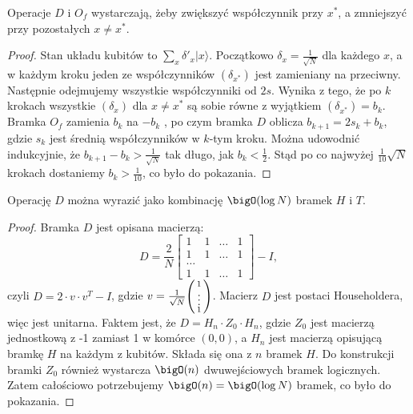 \begin{lemma}
    Operacje \( D \) i \( O_f \) wystarczają, żeby zwiększyć współczynnik przy \( x^{*} \), a zmniejszyć przy pozostałych \( x \neq x^{*} \).
\end{lemma}
\begin{proof}
    Stan układu kubitów to \( \sum_{x} \delta'_x |x\rangle \). Początkowo \( \delta_x = \frac{1}{\sqrt{N}} \) dla każdego \( x \),
    a w każdym kroku jeden ze współczynników \( (\delta_{x^{*}}) \) jest zamieniany na przeciwny. Następnie odejmujemy wszystkie współczynniki od \( 2s \).
    Wynika z tego, że po \( k \) krokach wszystkie \( (\delta_x) \) dla \( x \neq x^{*} \) są sobie równe z wyjątkiem \( (\delta_{x^{*}}) = b_k \).
    Bramka \( O_f \) zamienia \( b_k \) na \( -b_k \) , po czym bramka \( D \) oblicza \( b_{k+1} = 2s_k + b_k \), gdzie \( s_k \) jest średnią współczynników w \( k \)-tym kroku.
    Można udowodnić indukcyjnie, że \( b_{k+1} - b_k > \frac{1}{\sqrt{N}} \) tak długo, jak \( b_k < \frac{1}{2} \).
    Stąd po co najwyżej \( \frac{1}{10} \sqrt{N} \) krokach dostaniemy \( b_k > \frac{1}{10} \), co było do pokazania.
\end{proof}
\begin{lemma}
    Operację \( D \) można wyrazić jako kombinację \( \bigO(\log N) \) bramek \( H \) i \( T \).
\end{lemma}
\begin{proof}
    Bramka \( D \) jest opisana macierzą:
    \[
        D = \frac{2}{N}
        \begin{bmatrix}
        1 & 1 & \ldots & 1 \\
        1 & 1 & \ldots & 1 \\
        \ldots \\
        1 & 1 & \ldots & 1
        \end{bmatrix}
        - I,
    \]
    czyli \( D = 2 \cdot v \cdot v^T - I \), gdzie \( v = \frac{1}{\sqrt{N}}
    \pars{\begin{smallmatrix}
    1 \\
    \vdots \\
    1
    \end{smallmatrix}} \).
    Macierz \( D \) jest postaci Householdera, więc jest unitarna. Faktem jest, że \( D = H_n \cdot Z_0 \cdot H_n \), gdzie \( Z_0 \) jest macierzą jednostkową z -1 zamiast 1 w komórce \( (0,0) \),
    a \( H_n \) jest macierzą opisującą bramkę \( H \) na każdym z kubitów. Składa się ona z \( n \) bramek \( H \). Do konstrukcji bramki \( Z_0 \) również wystarcza \( \bigO(n) \) dwuwejściowych bramek logicznych.
    Zatem całościowo potrzebujemy \( \bigO(n) = \bigO(\log N) \) bramek, co było do pokazania.
\end{proof}
